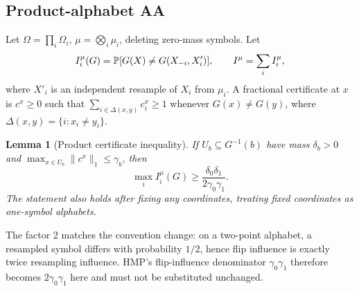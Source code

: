 \documentclass[11pt]{article}
\newtheorem{lemma}[theorem]{Lemma}
\theoremstyle{definition}\newtheorem{definition}[theorem]{Definition}
\theoremstyle{remark}\newtheorem{remark}[theorem]{Remark}
\begin{document}
\subsection{Product-alphabet AA}\label{sec:product-alphabet}
Let \(\Omega=\prod_i\Omega_i\), \(\mu=\bigotimes_i\mu_i\), deleting zero-mass symbols. Let
\[
 I^\mu_i(G)=\mathbb P[G(X)\ne G(X_{-i},X'_i)],\qquad I^\mu=\sum_iI^\mu_i,
\]
where \(X'_i\) is an independent resample of \(X_i\) from \(\mu_i\). A fractional certificate at \(x\) is \(c^x\ge0\) such that \(\sum_{i\in\Delta(x,y)}c^x_i\ge1\) whenever \(G(x)\ne G(y)\), where \(\Delta(x,y)=\{i:x_i\ne y_i\}\).

\begin{lemma}[Product certificate inequality]\label{lem:product-cert}
If \(U_b\subseteq G^{-1}(b)\) have mass \(\delta_b>0\) and \(\max_{x\in U_b}\|c^x\|_1\le\gamma_b\), then
\[
 \max_iI^\mu_i(G)\ge\frac{\delta_0\delta_1}{2\gamma_0\gamma_1}.
\]
The statement also holds after fixing any coordinates, treating fixed coordinates as one-symbol alphabets.
\end{lemma}
The factor 2 matches the convention change: on a two-point alphabet, a resampled symbol differs with probability \(1/2\), hence flip influence is exactly twice resampling influence. HMP's flip-influence denominator \(\gamma_0\gamma_1\) therefore becomes \(2\gamma_0\gamma_1\) here and must not be substituted unchanged.
\end{document}
